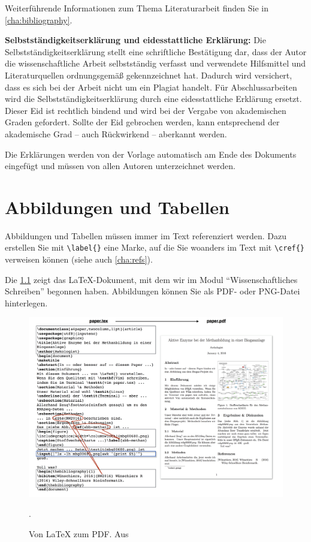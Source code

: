 Weiterführende Informationen zum Thema Literaturarbeit finden Sie in \cref{cha:bibliography}.
	
	
\textbf{Selbstständigkeitserklärung und eidesstattliche Erklärung:}\label{itm:soa}
Die Selbstständigkeitserklärung stellt eine schriftliche Bestätigung dar, dass der Autor die wissenschaftliche Arbeit selbstständig verfasst und verwendete Hilfsmittel und Literaturquellen ordnungsgemäß gekennzeichnet hat. Dadurch wird versichert, dass es sich bei der Arbeit nicht um ein Plagiat handelt. Für Abschlussarbeiten wird die Selbstständigkeitserklärung durch eine eidesstattliche Erklärung ersetzt. Dieser Eid ist rechtlich bindend und wird bei der Vergabe von akademischen Graden gefordert. Sollte der Eid gebrochen werden, kann entsprechend der akademische Grad -- auch Rückwirkend -- aberkannt werden.

Die Erklärungen werden von der Vorlage automatisch am Ende des Dokuments eingefügt und müssen von allen Autoren unterzeichnet werden.

\chapter{Abbildungen und Tabellen}
\label{cha:abb_und_tab}
Abbildungen und Tabellen müssen immer im Text referenziert werden. Dazu erstellen Sie mit \verb+\label{}+ eine Marke, auf die Sie woanders im Text mit \verb+\cref{}+ verweisen können (siehe auch \cref{cha:refs}).

Die \cref{fig:latex_2} zeigt das \LaTeX{}-Dokument, mit dem wir im Modul \enquote{Wissenschaftliches Schreiben} begonnen haben. Abbildungen können Sie als PDF- oder PNG-Datei hinterlegen.

\begin{figure}[h]
    \centering
    \includegraphics[width=.7\columnwidth]{fig-latex-2.png}
    \caption{Von \LaTeX{} zum PDF. Aus \citep{Wuenschiers2016}}.
    \label{fig:latex_2}
\end{figure}

